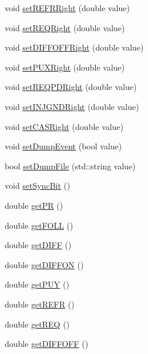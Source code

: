 \begin{DoxyCompactItemize}
\item 
void \hyperlink{classdevice2yarp_a026af71fd22a53e87896a1b1e5fbe2d9}{set\-R\-E\-F\-R\-Right} (double value)
\item 
void \hyperlink{classdevice2yarp_acb5c45d2835c3ea311f81daf2f4545cd}{set\-R\-E\-Q\-Right} (double value)
\item 
void \hyperlink{classdevice2yarp_a5a62082f903ae997ee15f3616c332635}{set\-D\-I\-F\-F\-O\-F\-F\-Right} (double value)
\item 
void \hyperlink{classdevice2yarp_a86ac1223c0a74dacebc26597e1a16ae9}{set\-P\-U\-X\-Right} (double value)
\item 
void \hyperlink{classdevice2yarp_aaac082c96f859df902389e60be83c328}{set\-R\-E\-Q\-P\-D\-Right} (double value)
\item 
void \hyperlink{classdevice2yarp_afab1c11e9c891a5b2103afa5d6101374}{set\-I\-N\-J\-G\-N\-D\-Right} (double value)
\item 
void \hyperlink{classdevice2yarp_aaa3573b8c4bb7e0348c97b87ef8edcd2}{set\-C\-A\-S\-Right} (double value)
\item 
void \hyperlink{classdevice2yarp_a4ef67bab52a9bbee2c590960afffc2e3}{set\-Dump\-Event} (bool value)
\item 
bool \hyperlink{classdevice2yarp_ac53bd1cc581717e681ad3ea0962db697}{set\-Dump\-File} (std\-::string value)
\item 
void \hyperlink{classdevice2yarp_ad5c9adf0e41f78d38a1d1b9265011dfa}{set\-Sync\-Bit} ()
\item 
double \hyperlink{classdevice2yarp_a85742caba0c13dbec757e034419ac570}{get\-P\-R} ()
\item 
double \hyperlink{classdevice2yarp_a45256821729711ac676b98fd86a2934b}{get\-F\-O\-L\-L} ()
\item 
double \hyperlink{classdevice2yarp_ac49ff696fd4ca634fb00188c7f84d5e0}{get\-D\-I\-F\-F} ()
\item 
double \hyperlink{classdevice2yarp_ae82c9cacfc6df370b144f764e1ba2d71}{get\-D\-I\-F\-F\-O\-N} ()
\item 
double \hyperlink{classdevice2yarp_a35e0c7313c78f7d4cfe7403b20742be7}{get\-P\-U\-Y} ()
\item 
double \hyperlink{classdevice2yarp_a0cfbc83863780cb22777ea0df0dff4bb}{get\-R\-E\-F\-R} ()
\item 
double \hyperlink{classdevice2yarp_a02f8aaa21afea5a2c3cf690d4a7a810a}{get\-R\-E\-Q} ()
\item 
double \hyperlink{classdevice2yarp_aebb49f54bbbd1f89767ebc7473cf27f8}{get\-D\-I\-F\-F\-O\-F\-F} ()

\end{DoxyCompactItemize}
